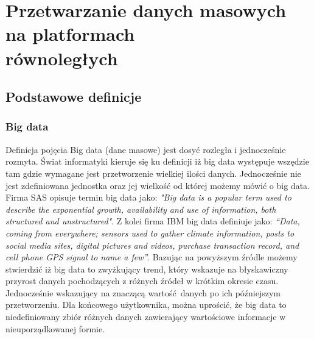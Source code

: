 \chapter{Przetwarzanie danych masowych na platformach\\równoległych} \label{chap.big-data-processing}

\section{Podstawowe definicje}
\subsection{Big data}
Definicja pojęcia Big data (dane masowe) jest dosyć rozległa i jednocześnie rozmyta. Świat informatyki kieruje się ku definicji iż big data występuje wszędzie tam gdzie wymagane jest przetworzenie wielkiej ilości danych. Jednocześnie nie jest zdefiniowana jednostka oraz jej wielkość od której możemy mówić o big data. Firma SAS opisuje termin big data jako: \newline \textit{"Big data is 
a  popular  term  used  to  describe  the  exponential  growth,  
availability  and  use  of  information,  both  structured  and  
unstructured"}. \newline Z kolei firma IBM big data definiuje jako: \textit{“Data, 
coming  from  everywhere;  sensors  used  to  gather  climate  
information,  posts  to  social  media  sites,  digital  pictures  
and  videos,  purchase  transaction  record,  and  cell  phone  
GPS signal to name a few”}.\cite{big_data_concept} Bazując na powyższym źródle możemy stwierdzić iż big data to zwyżkujący trend, który wskazuje na błyskawiczny przyrost danych pochodzących z różnych źródeł w krótkim okresie czasu. Jednocześnie wskazujący na znaczącą wartość danych po ich późniejszym przetworzeniu. Dla końcowego użytkownika, można uprościć, że big data to niedefiniowany zbiór różnych danych zawierający wartościowe informacje w nieuporządkowanej formie.
